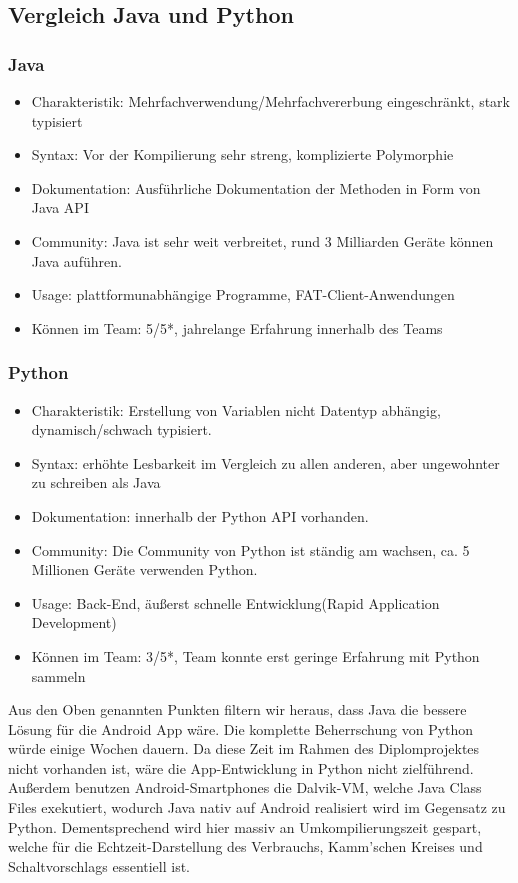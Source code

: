 \clearpage
\subsection{Vergleich Java und Python}
\subsubsection{Java}
\begin{itemize}
\item Charakteristik: Mehrfachverwendung/Mehrfachvererbung eingeschränkt, stark typisiert
\item Syntax: Vor der Kompilierung sehr streng, komplizierte Polymorphie
\item Dokumentation: Ausführliche Dokumentation der Methoden in Form von Java API
\item Community: Java ist sehr weit verbreitet, rund 3 Milliarden Geräte können Java auführen.
\item Usage: plattformunabhängige Programme, FAT-Client-Anwendungen
\item Können im Team: 5/5*, jahrelange Erfahrung innerhalb des Teams
\end{itemize}

\subsubsection{Python}
\begin{itemize}
\item Charakteristik: Erstellung von Variablen nicht Datentyp abhängig, dynamisch/schwach typisiert.
\item Syntax: erhöhte Lesbarkeit im Vergleich zu allen anderen, aber ungewohnter zu schreiben als Java
\item Dokumentation: innerhalb der Python API vorhanden.
\item Community: Die Community von Python ist ständig am wachsen, ca. 5 Millionen Geräte verwenden Python.
\item Usage: Back-End, äußerst schnelle Entwicklung(Rapid Application Development)
\item Können im Team: 3/5*, Team konnte erst geringe Erfahrung mit Python sammeln
\end{itemize}

Aus den Oben genannten Punkten filtern wir heraus, dass Java die bessere Lösung für die Android App wäre. 
Die komplette Beherrschung von Python würde einige Wochen dauern. 
Da diese Zeit im Rahmen des Diplomprojektes nicht vorhanden ist, wäre die App-Entwicklung in Python nicht zielführend. 
Außerdem benutzen Android-Smartphones die Dalvik-VM, welche Java Class Files exekutiert, 
wodurch Java nativ auf Android realisiert wird im Gegensatz zu Python. 
Dementsprechend wird hier massiv an Umkompilierungszeit gespart, welche für die Echtzeit-Darstellung des Verbrauchs, 
Kamm'schen Kreises und Schaltvorschlags essentiell ist.

